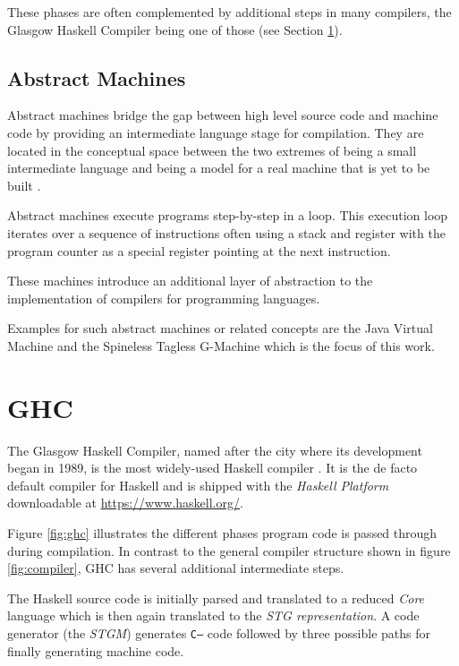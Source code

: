 \documentclass[runningheads]{llncs}
\begin{document}
These phases are often complemented by additional steps in many compilers, the Glasgow Haskell Compiler being one of those (see Section \ref{sec:ghc}).

\subsection{Abstract Machines}
Abstract machines bridge the gap between high level source code and machine code by providing an intermediate language stage for compilation. They are located in the conceptual space between the two extremes of being a small intermediate language and being a model for a real machine that is yet to be built \cite{diehl2000abstract}.

Abstract machines execute programs step-by-step in a loop. This execution loop iterates over a sequence of instructions often using a stack and register with the program counter as a special register pointing at the next instruction. \cite{diehl2000abstract}

These machines introduce an additional layer of abstraction to the implementation of compilers for programming languages.

Examples for such abstract machines or related concepts are the Java Virtual Machine and the Spineless Tagless G-Machine which is the focus of this work.

\section{GHC}
\label{sec:ghc}
The Glasgow Haskell Compiler, named after the city where its development began in 1989, is the most widely-used Haskell compiler \cite{marlow2007faster}. It is the de facto default compiler for Haskell and is shipped with the \textit{Haskell Platform} downloadable at \url{https://www.haskell.org/}.

Figure \ref{fig:ghc} illustrates the different phases program code is passed through during compilation. In contrast to the general compiler structure shown in figure \ref{fig:compiler}, GHC has several additional intermediate steps. 

The Haskell source code is initially parsed and translated to a reduced \textit{Core} language which is then again translated to the \textit{STG representation}. A code generator (the \textit{STGM}) generates \texttt{C--} code followed by three possible paths for finally generating machine code.
\end{document}
